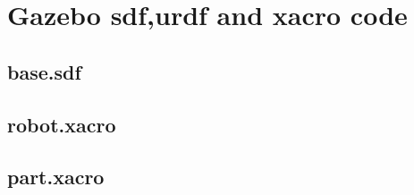 \newpage
\section{Gazebo sdf,urdf and xacro code}
\subsection{base.sdf}
\label{lst:base}


\subsection{robot.xacro}
\label{lst:robotXacro}


\subsection{part.xacro}
\label{lst:partXacro}

